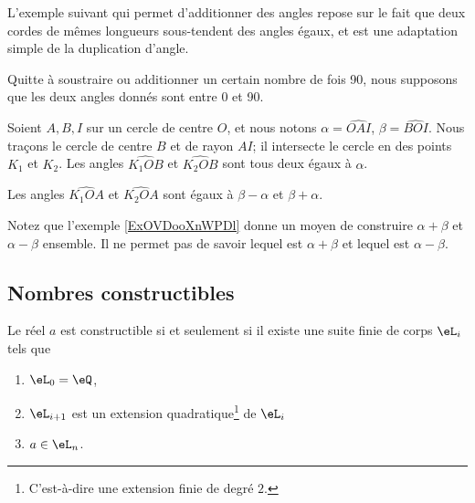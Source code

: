 L'exemple suivant qui permet d'additionner des angles repose sur le fait que deux cordes de mêmes longueurs sous-tendent des angles égaux, et est une adaptation simple de la duplication d'angle.

\begin{example}  \label{ExOVDooXnWPDl}
	Quitte à soustraire ou additionner un certain nombre de fois \unit{90}{\degree}, nous supposons que les deux angles donnés sont entre \unit{0}{\degree} et \unit{90}{\degree}.

	Soient \( A,B,I\) sur un cercle de centre \( O\), et nous notons \( \alpha=\widehat{OAI}\), \( \beta=\widehat{BOI}\). Nous traçons le cercle de centre \( B\) et de rayon \( AI\); il intersecte le cercle en des points \( K_1\) et \( K_2\). Les angles \( \widehat{K_1OB}\) et \( \widehat{K_2OB}\) sont tous deux égaux à \( \alpha\).

	Les angles \( \widehat{K_1OA}\) et \( \widehat{K_2OA}\) sont égaux à \( \beta-\alpha \) et \( \beta+\alpha\).
\end{example}

\begin{normaltext}
	Notez que l'exemple \ref{ExOVDooXnWPDl} donne un moyen de construire \( \alpha+\beta\) et \( \alpha-\beta\) ensemble. Il ne permet pas de savoir lequel est \( \alpha+\beta\) et lequel est \( \alpha-\beta\).
\end{normaltext}

\subsection{Nombres constructibles}

\begin{theorem} \label{ThoRHFooZsLbqd}
	Le réel \( a\) est constructible si et seulement si il existe une suite finie de corps \( \eL_i\) tels que
	\begin{enumerate}
		\item
		      \( \eL_0=\eQ\),
		\item
		      \( \eL_{i+1}\) est un extension quadratique\footnote{C'est-à-dire une extension finie de degré \( 2\).} de \( \eL_i\)
		\item
		      \( a\in \eL_n\).
	\end{enumerate}
\end{theorem}

